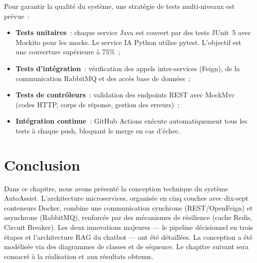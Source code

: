 Pour garantir la qualit\'{e} du syst\`{e}me, une strat\'{e}gie de tests multi-niveaux est pr\'{e}vue~:

\begin{itemize}
    \item \textbf{Tests unitaires}~: chaque service Java est couvert par des tests JUnit~5 avec Mockito pour les mocks. Le service IA Python utilise pytest. L'objectif est une couverture sup\'{e}rieure \`{a} 75\%~;
    \item \textbf{Tests d'int\'{e}gration}~: v\'{e}rification des appels inter-services (Feign), de la communication RabbitMQ et des acc\`{e}s base de donn\'{e}es~;
    \item \textbf{Tests de contr\^{o}leurs}~: validation des endpoints REST avec MockMvc (codes HTTP, corps de r\'{e}ponse, gestion des erreurs)~;
    \item \textbf{Int\'{e}gration continue}~: GitHub Actions ex\'{e}cute automatiquement tous les tests \`{a} chaque push, bloquant le merge en cas d'\'{e}chec.
\end{itemize}

\section*{Conclusion}
\label{sec:conclusion_ch2}

Dans ce chapitre, nous avons pr\'{e}sent\'{e} la conception technique du syst\`{e}me AutoAssist. L'architecture microservices, organis\'{e}e en cinq couches avec dix-sept conteneurs Docker, combine une communication synchrone (REST/OpenFeign) et asynchrone (RabbitMQ), renforc\'{e}e par des m\'{e}canismes de r\'{e}silience (cache Redis, Circuit Breaker). Les deux innovations majeures --- le pipeline d\'{e}cisionnel en trois \'{e}tapes et l'architecture RAG du chatbot --- ont \'{e}t\'{e} d\'{e}taill\'{e}es. La conception a \'{e}t\'{e} mod\'{e}lis\'{e}e via des diagrammes de classes et de s\'{e}quence. Le chapitre suivant sera consacr\'{e} \`{a} la r\'{e}alisation et aux r\'{e}sultats obtenus.
